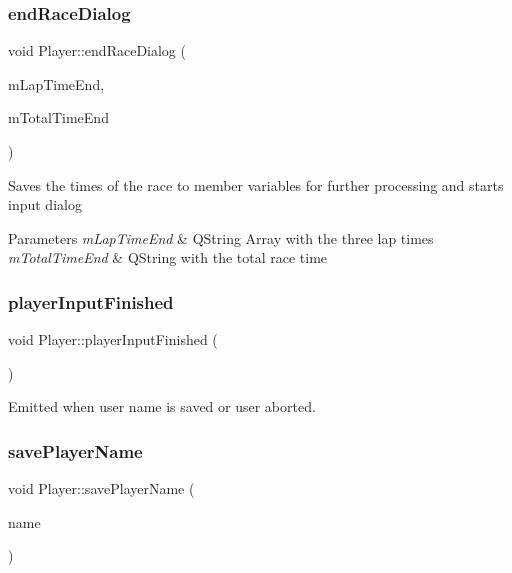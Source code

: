 \subsubsection{\texorpdfstring{endRaceDialog}{endRaceDialog}}
{\footnotesize\ttfamily void Player\+::end\+Race\+Dialog (\begin{DoxyParamCaption}\item[{Q\+String $\ast$}]{m\+Lap\+Time\+End,  }\item[{Q\+String}]{m\+Total\+Time\+End }\end{DoxyParamCaption})\hspace{0.3cm}{\ttfamily [slot]}}

Saves the times of the race to member variables for further processing and starts input dialog 
\begin{DoxyParams}{Parameters}
{\em m\+Lap\+Time\+End} & Q\+String Array with the three lap times \\
\hline
{\em m\+Total\+Time\+End} & Q\+String with the total race time \\
\hline
\end{DoxyParams}
\mbox{\label{class_player_a0a126c5c399f9a8292f9076912b64ebe}} 
\subsubsection{\texorpdfstring{playerInputFinished}{playerInputFinished}}
{\footnotesize\ttfamily void Player\+::player\+Input\+Finished (\begin{DoxyParamCaption}{ }\end{DoxyParamCaption})\hspace{0.3cm}{\ttfamily [signal]}}



Emitted when user name is saved or user aborted. 

\mbox{\label{class_player_a6a28fb76afd94ade6b42289b0496ceeb}} 
\subsubsection{\texorpdfstring{savePlayerName}{savePlayerName}}
{\footnotesize\ttfamily void Player\+::save\+Player\+Name (\begin{DoxyParamCaption}\item[{Q\+String}]{name }\end{DoxyParamCaption})\hspace{0.3cm}{\ttfamily [slot]}}



